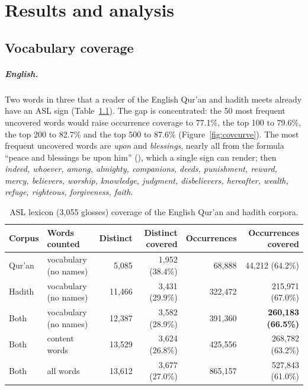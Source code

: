 \chapter{Results and analysis}
\label{sec:results}

\section{Vocabulary coverage}
\paragraph{English.} Two words in three that a reader of the English Qur'an and hadith meets already have an ASL sign
(Table~\ref{tab:coverage}). The gap is concentrated: the 50 most frequent uncovered words would raise occurrence coverage
to 77.1\%, the top 100 to 79.6\%, the top 200 to 82.7\% and the top 500 to 87.6\% (Figure~\ref{fig:covcurve}). The most
frequent uncovered words are \emph{upon} and \emph{blessings}, nearly all from the formula ``peace and blessings be upon
him'' (), which a single sign can render; then \emph{indeed, whoever, among, almighty, companions, deeds,
punishment, reward, mercy, believers, worship, knowledge, judgment, disbelievers, hereafter, wealth, refuge, righteous,
forgiveness, faith}.

\begin{table}[ht]
\centering\small
\caption{ASL lexicon (3,055 glosses) coverage of the English Qur'an and hadith corpora.}
\label{tab:coverage}
\begin{tabular}{l l r r r r}
\toprule
Corpus & Words counted & Distinct & Distinct covered & Occurrences & Occurrences covered \\
\midrule
Qur'an & vocabulary (no names) & 5,085 & 1,952 (38.4\%) & 68,888 & 44,212 (64.2\%) \\
Hadith & vocabulary (no names) & 11,466 & 3,431 (29.9\%) & 322,472 & 215,971 (67.0\%) \\
Both & vocabulary (no names) & 12,387 & 3,582 (28.9\%) & 391,360 & \textbf{260,183 (66.5\%)} \\
Both & content words & 13,529 & 3,624 (26.8\%) & 425,556 & 268,782 (63.2\%) \\
Both & all words & 13,612 & 3,677 (27.0\%) & 865,157 & 527,843 (61.0\%) \\
\bottomrule
\end{tabular}
\end{table}

